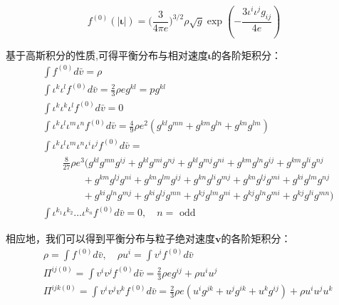 \documentclass[LBMDerivation.tex]{subfiles}
\begin{document}
\begin{equation}
  \boxed{
  f^{(0)}(| \boldsymbol{\iota}|) =  {(\frac{3}{4\pi e}})^{3/2}\rho \sqrt{g} \exp({-\frac{3 {\iota^i\iota^jg_{ij}}}{4e}})
  }
  \label{EQUATION::平衡分布2} ~
\end{equation}


基于高斯积分的性质,可得平衡分布与相对速度$\boldsymbol{\iota}$的各阶矩积分：
%
%
\begin{equation}
  \begin{aligned}
     & \int  f^{(0)} d\bar{v}=\rho                                                                                                                                \\
     & \int  \iota^{k} \iota^{l} f^{(0)}d\bar{v} = \frac{2}{3}\rho e g^{k l}  =pg^{k l}                                                                           \\
     & \int  \iota^{k} \iota^{k} \iota^{l} f^{(0)}d\bar{v}  = 0                                                                                                   \\
     & \int  \iota^{k} \iota^{l}  \iota^{m} \iota^{n} f^{(0)}d\bar{v}  =     \frac{4}{9}\rho e^2 (g^{kl}g^{mn}+g^{km}g^{ln}+g^{kn}g^{lm})                         \\
     & \int  \iota^{k} \iota^{l}  \iota^{m} \iota^{n} \iota^{i} \iota^{j} f^{(0)}d\bar{v}  =                                                                      \\
     & \quad\quad  \frac{8}{27}\rho e^3 ( g^{k l} g^{m n} g^{i j}+g^{k l} g^{m i} g^{n j}+g^{k l} g^{m j} g^{n i}+g^{k m} g^{l n} g^{i j}+g^{k m} g^{l i} g^{n j} \\
     & \quad\quad\quad\quad +g^{k m} g^{l j} g^{n i}+g^{k n} g^{l m} g^{i j}+g^{k n} g^{l i} g^{m j}+g^{k n} g^{l j} g^{m i}+g^{k i} g^{l m} g^{n j}              \\
     & \quad\quad\quad\quad +g^{k i} g^{l n} g^{m j}+g^{k i} g^{l j} g^{m n}+g^{k j} g^{l m} g^{n i}+g^{k j} g^{l n} g^{m i}+g^{k j} g^{l i} g^{m n})             \\
     & \int \iota^{k_{1}} \iota^{k_{2}} \ldots \iota^{k_{n}}  f^{(0)}d \bar{v}  =0, \quad n=\text { odd }
  \end{aligned}
  \label{EQUATION::A.19} ~
\end{equation}
%
%

相应地，我们可以得到平衡分布与粒子绝对速度$\boldsymbol{v}$的各阶矩积分：
\begin{equation}
  \begin{aligned}
     & \rho=\int f^{(0)} d \bar{v}, \quad \rho u^{i}=\int  v^{i} f^{(0)} d \bar{v}                                                               \\
     & \Pi^{i j (0)}=\int  v^{i} v^{j} f^{(0)}d \bar{v}= \frac{2}{3}\rho e g^{i j}+\rho u^{i} u^{j}                                              \\
     & \Pi^{i j k (0)}=\int  v^{i} v^{j} v^{k}  f^{(0)} d \bar{v}= \frac{2}{3}\rho e (u^i g^{jk}+u^j g^{ik} + u^k g^{ij})+\rho u^{i} u^{j} u^{k} \\
  \end{aligned}
  \label{EQUATION::A.20} ~
\end{equation}
%
\end{document}
